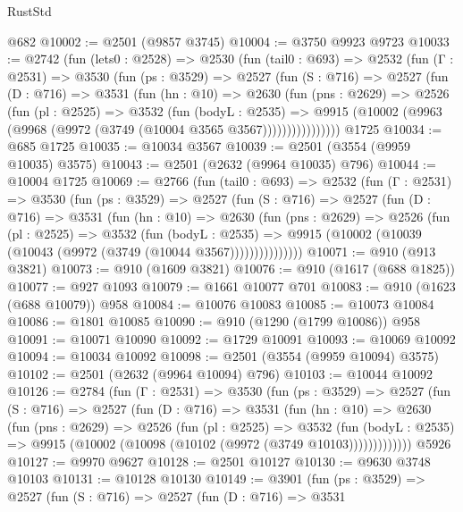 \begin{lexlean}{RustStd}
\begin{coremodule}
{\begin{coremodule}
{{{{{{{{{{{{{{{{{{{{    @682
@10002 := @2501 (@9857 @3745)
@10004 := @3750 @9923 @9723
@10033 := @2742
    (fun (lets0 : @2528) =>
    @2530
      (fun (tail0 : @693) =>
      @2532
        (fun (Γ : @2531) =>
        @3530
          (fun (ps : @3529) =>
          @2527
            (fun (S : @716) =>
            @2527
              (fun (D : @716) =>
              @3531
                (fun (hn : @10) =>
                @2630
                  (fun (pns : @2629) =>
                  @2526
                    (fun (pl : @2525) =>
                    @3532
                      (fun (bodyL : @2535) =>
                      @9915 (@10002 (@9963 (@9968 (@9972 (@3749 (@10004 @3565 @3567))))))))))))))))
    @1725
@10034 := @685 @1725
@10035 := @10034 @3567
@10039 := @2501 (@3554 (@9959 @10035) @3575)
@10043 := @2501 (@2632 (@9964 @10035) @796)
@10044 := @10004 @1725
@10069 := @2766
    (fun (tail0 : @693) =>
    @2532
      (fun (Γ : @2531) =>
      @3530
        (fun (ps : @3529) =>
        @2527
          (fun (S : @716) =>
          @2527
            (fun (D : @716) =>
            @3531
              (fun (hn : @10) =>
              @2630
                (fun (pns : @2629) =>
                @2526
                  (fun (pl : @2525) =>
                  @3532
                    (fun (bodyL : @2535) =>
                    @9915 (@10002 (@10039 (@10043 (@9972 (@3749 (@10044 @3567)))))))))))))))
@10071 := @910 (@913 @3821)
@10073 := @910 (@1609 @3821)
@10076 := @910 (@1617 (@688 @1825))
@10077 := @927 @1093
@10079 := @1661 @10077 @701
@10083 := @910 (@1623 (@688 @10079)) @958
@10084 := @10076 @10083
@10085 := @10073 @10084
@10086 := @1801 @10085
@10090 := @910 (@1290 (@1799 @10086)) @958
@10091 := @10071 @10090
@10092 := @1729 @10091
@10093 := @10069 @10092
@10094 := @10034 @10092
@10098 := @2501 (@3554 (@9959 @10094) @3575)
@10102 := @2501 (@2632 (@9964 @10094) @796)
@10103 := @10044 @10092
@10126 := @2784
    (fun (Γ : @2531) =>
    @3530
      (fun (ps : @3529) =>
      @2527
        (fun (S : @716) =>
        @2527
          (fun (D : @716) =>
          @3531
            (fun (hn : @10) =>
            @2630
              (fun (pns : @2629) =>
              @2526
                (fun (pl : @2525) =>
                @3532
                  (fun (bodyL : @2535) =>
                  @9915 (@10002 (@10098 (@10102 (@9972 (@3749 @10103)))))))))))))
    @5926
@10127 := @9970 @9627
@10128 := @2501 @10127
@10130 := @9630 @3748 @10103
@10131 := @10128 @10130
@10149 := @3901
    (fun (ps : @3529) =>
    @2527
      (fun (S : @716) =>
      @2527
        (fun (D : @716) =>
        @3531
}}}}}}}}}}}}}}}}}}}}
\end{coremodule}}
\end{coremodule}
\end{lexlean}
